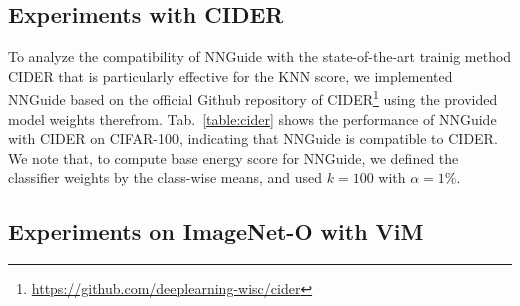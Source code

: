 \documentclass[10pt,twocolumn,letterpaper]{article}
\begin{document}
\subsection{Experiments with CIDER}

\begin{table}[t]
\centering
{}
\caption{
The results of NNGuide with CIDER on CIFAR-100 (ID).
}
\label{table:cider}
\end{table}

To analyze the compatibility of NNGuide with the state-of-the-art trainig method CIDER \cite{ming2022exploit} that is particularly effective for the KNN score, we implemented NNGuide based on the official Github repository of CIDER\footnote{\url{https://github.com/deeplearning-wisc/cider}} using the provided model weights therefrom. Tab.~\ref{table:cider} shows the performance of NNGuide with CIDER on CIFAR-100, indicating that NNGuide is compatible to CIDER. We note that, to compute base energy score for NNGuide, we defined the classifier weights by the class-wise means, and used $k=100$ with $\alpha = 1\%$.



\subsection{Experiments on ImageNet-O with ViM}

\begin{table}[t]
\centering
{}
\caption{
The result of NNGuide with ViM on ImageNet-O in (FPR95$\downarrow$ / AUROC$\uparrow$). Here, ID is the ImageNet-1k, and the backbone is ViT-B-P16-384.
}
\label{table:imageneto}
\end{table}
\end{document}
